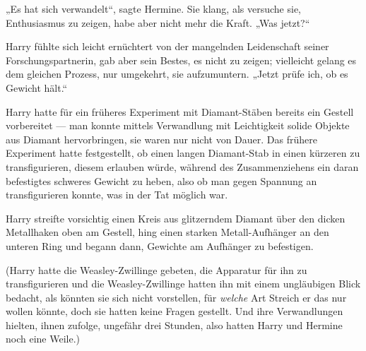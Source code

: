 „Es hat sich verwandelt“, sagte Hermine. Sie klang, als versuche sie, Enthusiasmus zu zeigen, habe aber nicht mehr die Kraft.
„Was jetzt?“

Harry fühlte sich leicht ernüchtert von der mangelnden Leidenschaft seiner Forschungspartnerin, gab aber sein Bestes, es nicht zu zeigen; vielleicht gelang es dem gleichen Prozess, nur umgekehrt, sie aufzumuntern.
„Jetzt prüfe ich, ob es Gewicht hält.“

Harry hatte für ein früheres Experiment mit Diamant-Stäben bereits ein Gestell vorbereitet — man konnte mittels Verwandlung mit Leichtigkeit solide Objekte aus Diamant hervorbringen, sie waren nur nicht von Dauer. Das frühere Experiment hatte festgestellt, ob einen langen Diamant-Stab in einen kürzeren zu transfigurieren, diesem erlauben würde, während des Zusammenziehens ein daran befestigtes schweres Gewicht zu heben, also ob man gegen Spannung an transfigurieren konnte, was in der Tat möglich war.

Harry streifte vorsichtig einen Kreis aus glitzerndem Diamant über den dicken Metallhaken oben am Gestell, hing einen starken Metall-Aufhänger an den unteren Ring und begann dann, Gewichte am Aufhänger zu befestigen.

(Harry hatte die Weasley-Zwillinge gebeten, die Apparatur für ihn zu transfigurieren und die Weasley-Zwillinge hatten ihn mit einem ungläubigen Blick bedacht, als könnten sie sich nicht vorstellen, für \emph{welche} Art Streich er das nur wollen könnte, doch sie hatten keine Fragen gestellt. Und ihre Verwandlungen hielten, ihnen zufolge, ungefähr drei Stunden, also hatten Harry und Hermine noch eine Weile.)

